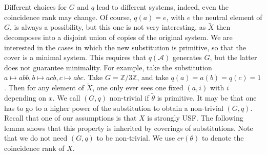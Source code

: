 \documentclass[10pt,a4paper]{amsart}
\numberwithin{equation}{section}
\newcommand{\Aa}{{\mathcal A}}
\begin{document}
Different choices for $G$ and $q$ lead to different systems, indeed, even the coincidence rank may change. Of course, $q(a) = e$, with $e$ the neutral element of $G$, is always a possibility, but this one is not very interesting, as $\tilde X$ then decomposes into a disjoint union of copies of the original system. 
We are interested in the cases in which the new substitution is primitive, so that the cover is a minimal system. This requires that $q(\Aa)$ generates $G$, but the latter does not guarantee minimality. For example, take the substitution $a\mapsto abb, b \mapsto acb , 
c \mapsto abc$. Take $G= \mathbb Z/3 \mathbb Z$, and take $q(a)=a(b)=q(c)=1$. Then for any element of $\tilde X$, one only ever sees one fixed $(a,i)$ with $i$ depending on $x$.
We call $(G,q)$ non-trivial if $\tilde\theta$ is primitive. 
It may be that one has to go to a higher power of the substitution to obtain a non-trivial $(G,q)$. 
Recall that one of our assumptions is that $X$ is strongly USF. 
The following lemma shows that this property is inherited by  coverings of substitutions. Note that we do not need  $(G,q)$ to be non-trivial. We use $cr(\theta)$ to denote the coincidence rank of $X$.
\end{document}
